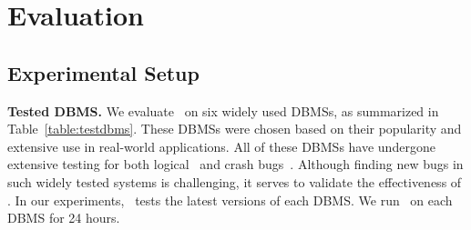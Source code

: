 \section{Evaluation}
\label{sec: Evaluation}

%

\subsection{Experimental Setup}
\textbf{Tested DBMS.}
We evaluate \toolname\ on six widely used DBMSs, as summarized in Table~\ref{table:testdbms}. 
These DBMSs were chosen based on their popularity and extensive use in real-world applications. 
All of these DBMSs have undergone extensive testing for both logical~\cite{hao2023pinolo,kamm2023testing,rigger2020testing,lin2025qtran,rigger2020detecting,rigger2020finding,song2023testing,tang2023detecting,jiang2024detecting,deng2025detecting,zhang2025constant} and crash bugs~\cite{jiang2023dynsql,sqlsmith,pingcap_gorandgen_2022,zhong2020squirrel}.
Although finding new bugs in such widely tested systems is challenging, it serves to validate the effectiveness of \toolname. 
In our experiments, \toolname\ tests the latest versions of each DBMS.  
We run \toolname\ on each DBMS for 24 hours.


